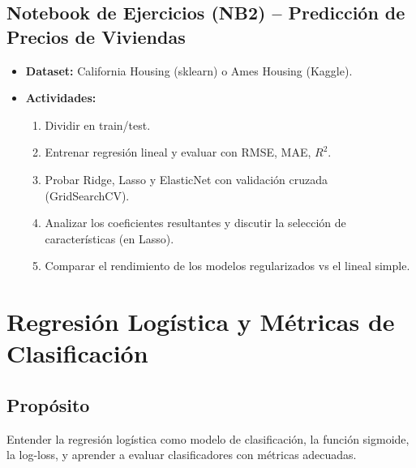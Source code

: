 \documentclass[12pt,a4paper]{article}
\begin{document}
\subsection*{Notebook de Ejercicios (NB2) – Predicción de Precios de Viviendas}
\begin{itemize}
    \item \textbf{Dataset:} California Housing (sklearn) o Ames Housing (Kaggle).
    \item \textbf{Actividades:}
    \begin{enumerate}
        \item Dividir en train/test.
        \item Entrenar regresión lineal y evaluar con RMSE, MAE, $R^2$.
        \item Probar Ridge, Lasso y ElasticNet con validación cruzada (GridSearchCV).
        \item Analizar los coeficientes resultantes y discutir la selección de características (en Lasso).
        \item Comparar el rendimiento de los modelos regularizados vs el lineal simple.
    \end{enumerate}
\end{itemize}

\section{Regresión Logística y Métricas de Clasificación}
\subsection*{Propósito}
Entender la regresión logística como modelo de clasificación, la función sigmoide, la log-loss, y aprender a evaluar clasificadores con métricas adecuadas.
\end{document}
